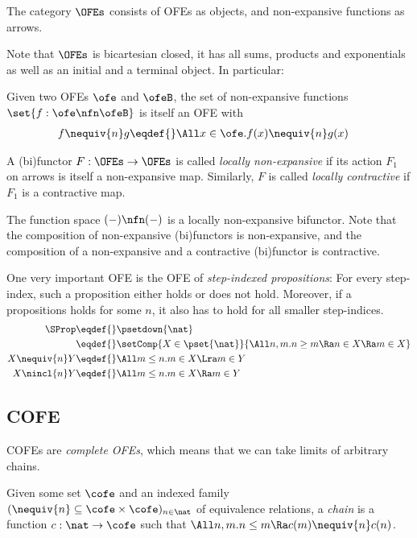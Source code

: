 \begin{defn}
  The category $\OFEs$ consists of OFEs as objects, and non-expansive functions as arrows.
\end{defn}

Note that $\OFEs$ is bicartesian closed, \ie it has all sums, products and exponentials as well as an initial and a terminal object.
In particular:
\begin{defn}
  Given two OFEs $\ofe$ and $\ofeB$, the set of non-expansive functions $\set{f : \ofe \nfn \ofeB}$ is itself an OFE with
  \begin{align*}
    f \nequiv{n} g \eqdef{}& \All x \in \ofe. f(x) \nequiv{n} g(x)
  \end{align*}
\end{defn}

\begin{defn}
  A (bi)functor $F : \OFEs \to \OFEs$ is called \emph{locally non-expansive} if its action $F_1$ on arrows is itself a non-expansive map.
  Similarly, $F$ is called \emph{locally contractive} if $F_1$ is a contractive map.
\end{defn}
The function space $(-) \nfn (-)$ is a locally non-expansive bifunctor.
Note that the composition of non-expansive (bi)functors is non-expansive, and the composition of a non-expansive and a contractive (bi)functor is contractive.

One very important OFE is the OFE of \emph{step-indexed propositions}:
For every step-index, such a proposition either holds or does not hold.
Moreover, if a propositions holds for some $n$, it also has to hold for all smaller step-indices.
\begin{align*}
  \SProp \eqdef{}& \psetdown{\nat} \\
    \eqdef{}& \setComp{X \in \pset{\nat}}{ \All n, m. n \geq m \Ra n \in X \Ra m \in X } \\
  X \nequiv{n} Y \eqdef{}& \All m \leq n. m \in X \Lra m \in Y \\
  X \nincl{n} Y \eqdef{}& \All m \leq n. m \in X \Ra m \in Y
\end{align*}

\subsection{COFE}

COFEs are \emph{complete OFEs}, which means that we can take limits of arbitrary chains.

\begin{defn}[Chain]
  Given some set $\cofe$ and an indexed family $({\nequiv{n}} \subseteq \cofe \times \cofe)_{n \in \nat}$ of equivalence relations, a \emph{chain} is a function $c : \nat \to \cofe$ such that $\All n, m. n \leq m \Ra c (m) \nequiv{n} c (n)$.
\end{defn}

